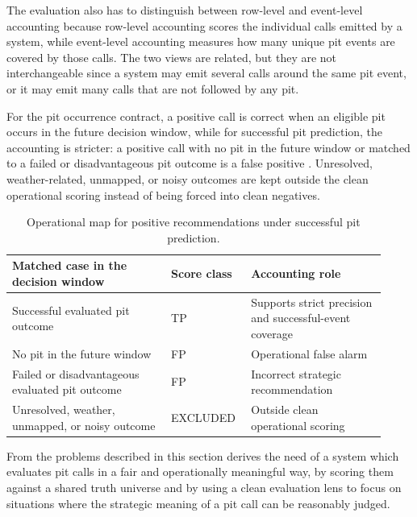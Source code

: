 The evaluation also has to distinguish between row-level and event-level accounting because row-level accounting scores the individual calls emitted by a system, while
event-level accounting measures how many unique pit events are covered by those calls.
The two views are related, but they are not interchangeable \citep{saito2015prroc,davis2006relationship} since 
a system may emit several calls around the same pit event, or it may emit many calls that are not followed by any pit.

For the pit occurrence contract, a positive call is correct when an eligible pit occurs in the future decision window, while
for successful pit prediction, the accounting is stricter:
a positive call with no pit in the future window or matched to a failed or disadvantageous pit outcome is a false positive \citep{elkan2001costsensitive}.
Unresolved, weather-related, unmapped, or noisy outcomes are kept outside the clean operational scoring instead of being forced into clean negatives.

\begin{table}[t]
    \centering
    \renewcommand{\arraystretch}{1.4}
    \caption{Operational map for positive recommendations under successful pit prediction.}
    \label{tab:pit_success_operational_map}
    \begin{tabular}{p{0.40\linewidth}p{0.18\linewidth}p{0.34\linewidth}}
        \toprule
        Matched case in the decision window             & Score class & Accounting role                                         \\
        \midrule
        Successful evaluated pit outcome                & TP          & Supports strict precision and successful-event coverage \\
        No pit in the future window                     & FP          & Operational false alarm                                 \\
        Failed or disadvantageous evaluated pit outcome & FP          & Incorrect strategic recommendation                      \\
        Unresolved, weather, unmapped, or noisy outcome & EXCLUDED    & Outside clean operational scoring                       \\
        \bottomrule
    \end{tabular}
\end{table}
\FloatBarrier

From the problems described in this section derives the need of a system which evaluates pit calls in a fair and operationally meaningful way, by scoring them against a
shared truth universe and by using a clean evaluation lens to focus on situations where the strategic meaning of a pit call can be reasonably judged.

